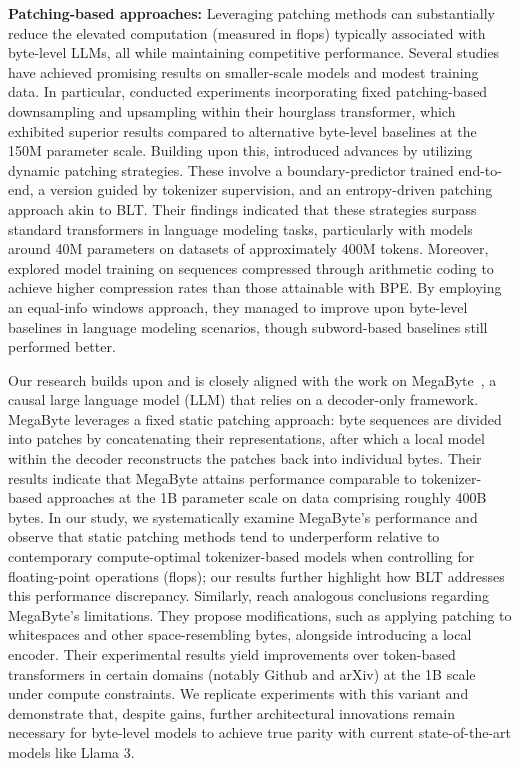 \textbf{Patching-based approaches:} Leveraging patching methods can substantially reduce the elevated computation (measured in flops) typically associated with byte-level LLMs, all while maintaining competitive performance. Several studies have achieved promising results on smaller-scale models and modest training data. In particular, \cite{nawrot-etal-2022-hierarchical} conducted experiments incorporating fixed patching-based downsampling and upsampling within their hourglass transformer, which exhibited superior results compared to alternative byte-level baselines at the 150M parameter scale. Building upon this, \cite{nawrot-etal-2023-efficient} introduced advances by utilizing dynamic patching strategies. These involve a boundary-predictor trained end-to-end, a version guided by tokenizer supervision, and an entropy-driven patching approach akin to {\textsc BLT}. Their findings indicated that these strategies surpass standard transformers in language modeling tasks, particularly with models around 40M parameters on datasets of approximately 400M tokens. Moreover, \cite{lester2024training} explored model training on sequences compressed through arithmetic coding to achieve higher compression rates than those attainable with BPE. By employing an equal-info windows approach, they managed to improve upon byte-level baselines in language modeling scenarios, though subword-based baselines still performed better.

Our research builds upon and is closely aligned with the work on MegaByte~\citep{yu2023megabyte}, a causal large language model (LLM) that relies on a decoder-only framework. MegaByte leverages a fixed static patching approach: byte sequences are divided into patches by concatenating their representations, after which a local model within the decoder reconstructs the patches back into individual bytes. Their results indicate that MegaByte attains performance comparable to tokenizer-based approaches at the 1B parameter scale on data comprising roughly 400B bytes. In our study, we systematically examine MegaByte's performance and observe that static patching methods tend to underperform relative to contemporary compute-optimal tokenizer-based models when controlling for floating-point operations (flops); our results further highlight how {\textsc BLT} addresses this performance discrepancy. Similarly, \cite{slagle2024spacebyte} reach analogous conclusions regarding MegaByte’s limitations. They propose modifications, such as applying patching to whitespaces and other space-resembling bytes, alongside introducing a local encoder. Their experimental results yield improvements over token-based transformers in certain domains (notably Github and arXiv) at the 1B scale under compute constraints. We replicate experiments with this variant and demonstrate that, despite gains, further architectural innovations remain necessary for byte-level models to achieve true parity with current state-of-the-art models like Llama 3.

